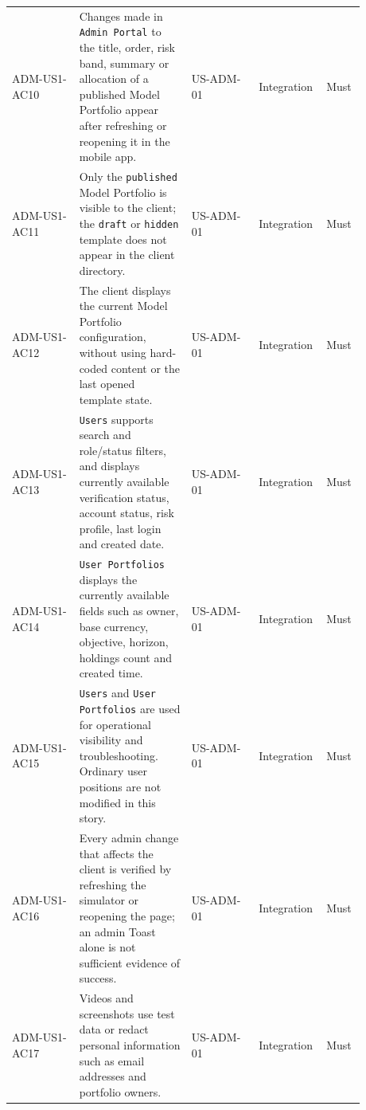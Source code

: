 \begin{longtable}{L{0.18\linewidth}L{0.30\linewidth}L{0.18\linewidth}L{0.12\linewidth}L{0.10\linewidth}}
ADM-US1-AC10 & Changes made in \texttt{Admin Portal} to the title, order, risk band, summary or allocation of a published Model Portfolio appear after refreshing or reopening it in the mobile app. & US-ADM-01 & Integration & Must \\
ADM-US1-AC11 & Only the \texttt{published} Model Portfolio is visible to the client; the \texttt{draft} or \texttt{hidden} template does not appear in the client directory. & US-ADM-01 & Integration & Must \\
ADM-US1-AC12 & The client displays the current Model Portfolio configuration, without using hard-coded content or the last opened template state. & US-ADM-01 & Integration & Must \\
ADM-US1-AC13 & \texttt{Users} supports search and role/\allowbreak{}status filters, and displays currently available verification status, account status, risk profile, last login and created date. & US-ADM-01 & Integration & Must \\
ADM-US1-AC14 & \texttt{User Portfolios} displays the currently available fields such as owner, base currency, objective, horizon, holdings count and created time. & US-ADM-01 & Integration & Must \\
ADM-US1-AC15 & \texttt{Users} and \texttt{User Portfolios} are used for operational visibility and troubleshooting. Ordinary user positions are not modified in this story. & US-ADM-01 & Integration & Must \\
ADM-US1-AC16 & Every admin change that affects the client is verified by refreshing the simulator or reopening the page; an admin Toast alone is not sufficient evidence of success. & US-ADM-01 & Integration & Must \\
ADM-US1-AC17 & Videos and screenshots use test data or redact personal information such as email addresses and portfolio owners. & US-ADM-01 & Integration & Must \\
\bottomrule
\end{longtable}
\endgroup
